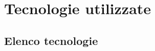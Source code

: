 \chapter{Tecnologie utilizzate}
\label{chap:tecnologie-utilizzate}

\section{Elenco tecnologie}

\newpage
